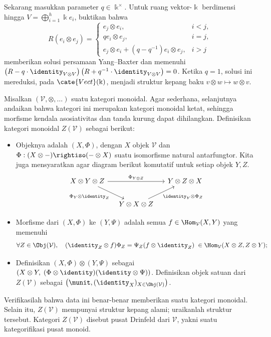 \begin{Exercises}
		Sekarang masukkan parameter $q \in \Bbbk^\times$. Untuk ruang vektor-$\Bbbk$ berdimensi hingga $V = \bigoplus_{i=1}^h \Bbbk e_i$, buktikan bahwa
		\[ R(e_i \otimes e_j) = \begin{cases}
			e_j \otimes e_i, & i < j, \\
			q e_i \otimes e_j, & i = j, \\
			e_j \otimes e_i + (q - q^{-1}) e_i \otimes e_j, & i > j
		\end{cases} \]
		memberikan solusi persamaan Yang--Baxter dan memenuhi $\left( R - q \cdot \identity_{V \otimes V} \right) \left( R + q^{-1} \cdot \identity_{V \otimes V} \right) = 0$. Ketika $q=1$, solusi ini mereduksi, pada $\cate{Vect}(\Bbbk)$, menjadi struktur kepang baku $v \otimes w \mapsto w \otimes v$. 

	\item Misalkan $(\mathcal{V}, \otimes, \ldots)$ suatu kategori monoidal. Agar sederhana, selanjutnya andaikan bahwa kategori ini merupakan kategori monoidal ketat, sehingga morfisme kendala asosiativitas dan tanda kurung dapat dihilangkan. Definisikan kategori monoidal $Z(\mathcal{V})$ sebagai berikut:
		\begin{itemize}
			\item Objeknya adalah $(X, \Phi)$, dengan $X$ objek $\mathcal{V}$ dan $\Phi: (X \otimes -) \rightiso (- \otimes X)$ suatu isomorfisme natural antarfungtor. Kita juga mensyaratkan agar diagram berikut komutatif untuk setiap objek $Y,Z$.
				\[\begin{tikzcd}[column sep=small]
					X \otimes Y \otimes Z \arrow[rr, "\Phi_{Y \otimes Z}"] \arrow[rd, "{\Phi_Y \otimes \identity_Z}"'] & & Y \otimes Z \otimes X \\
					&  Y \otimes X \otimes Z \arrow[ru, "{\identity_Y \otimes \Phi_Z}"'] &
				\end{tikzcd}\]
			\item Morfisme dari $(X, \Phi)$ ke $(Y, \Psi)$ adalah semua $f \in \Hom_{\mathcal{V}}(X,Y)$ yang memenuhi
				\[ \forall Z \in \Obj(\mathcal{V}),\quad (\identity_Z \otimes f) \Phi_Z = \Psi_Z (f \otimes \identity_Z) \; \in \Hom_{\mathcal{V}}(X \otimes Z, Z \otimes Y); \]
			\item Definisikan $(X, \Phi) \otimes (Y, \Psi)$ sebagai $(X \otimes Y,\; (\Phi \otimes \identity)(\identity \otimes \Psi))$. Definisikan objek satuan dari $Z(\mathcal{V})$ sebagai $\left(\munit, (\identity_X)_{X \in \Obj(\mathcal{V})}\right)$.
		\end{itemize}
		Verifikasilah bahwa data ini benar-benar memberikan suatu kategori monoidal. Selain itu, $Z(\mathcal{V})$ mempunyai struktur kepang alami; uraikanlah struktur tersebut. Kategori $Z(\mathcal{V})$ disebut pusat Drinfeld dari $\mathcal{V}$, yakni suatu kategorifikasi pusat monoid.

\end{Exercises}
